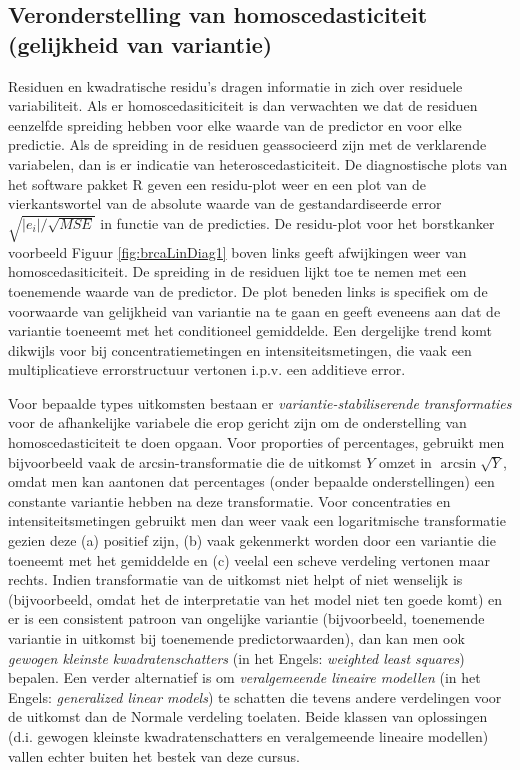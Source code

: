 \documentclass[
  12pt,dutch,coursenotes]{book}
\theoremstyle{definition}
\theoremstyle{definition}
\theoremstyle{definition}
\theoremstyle{definition}
\theoremstyle{remark}
\begin{document}
\hypertarget{veronderstelling-van-homoscedasticiteit-gelijkheid-van-variantie}{%
\subsection{Veronderstelling van homoscedasticiteit (gelijkheid van variantie)}\label{veronderstelling-van-homoscedasticiteit-gelijkheid-van-variantie}}

Residuen en kwadratische residu's dragen informatie in zich over residuele variabiliteit.
Als er homoscedasiticiteit is dan verwachten we dat de residuen eenzelfde spreiding hebben voor elke waarde van de predictor en voor elke predictie.
Als de spreiding in de residuen geassocieerd zijn met de verklarende variabelen, dan is er indicatie van heteroscedasticiteit.
De diagnostische plots van het software pakket R geven een residu-plot weer en een plot van de vierkantswortel van de absolute waarde van de gestandardiseerde error \(\sqrt{|e_i|/\sqrt{MSE}}\) in functie van de predicties.
De residu-plot voor het borstkanker voorbeeld Figuur \ref{fig:brcaLinDiag1} boven links geeft afwijkingen weer van homoscedasiticiteit.
De spreiding in de residuen lijkt toe te nemen met een toenemende waarde van de predictor.
De plot beneden links is specifiek om de voorwaarde van gelijkheid van variantie na te gaan en geeft eveneens aan dat de variantie toeneemt met het conditioneel gemiddelde.
Een dergelijke trend komt dikwijls voor bij concentratiemetingen en intensiteitsmetingen, die vaak een multiplicatieve errorstructuur vertonen i.p.v. een additieve error.

Voor bepaalde types uitkomsten bestaan er \emph{variantie-stabiliserende transformaties} voor de afhankelijke variabele die erop gericht zijn om de onderstelling van homoscedasticiteit te doen opgaan. Voor proporties of percentages, gebruikt men bijvoorbeeld vaak de arcsin-transformatie die de uitkomst \(Y\) omzet in \(\arcsin\sqrt{Y}\), omdat men kan aantonen dat percentages (onder bepaalde onderstellingen) een constante variantie hebben na deze transformatie.
Voor concentraties en intensiteitsmetingen gebruikt men dan weer vaak een logaritmische transformatie gezien deze (a) positief zijn, (b) vaak gekenmerkt worden door een variantie die toeneemt met het gemiddelde en (c) veelal een scheve verdeling vertonen maar rechts.
Indien transformatie van de uitkomst niet helpt of niet wenselijk is (bijvoorbeeld, omdat het de interpretatie van het model niet ten goede komt) en er is een consistent patroon van ongelijke variantie (bijvoorbeeld, toenemende variantie in uitkomst bij toenemende predictorwaarden), dan kan men ook \emph{gewogen kleinste kwadratenschatters} (in het Engels: \emph{weighted least squares}) bepalen. Een verder alternatief is om \emph{veralgemeende lineaire modellen} (in het Engels: \emph{generalized linear models}) te schatten die tevens andere verdelingen voor de uitkomst dan de Normale verdeling toelaten. Beide klassen van oplossingen (d.i. gewogen kleinste kwadratenschatters en veralgemeende lineaire modellen) vallen echter buiten het bestek van deze cursus.
\end{document}
